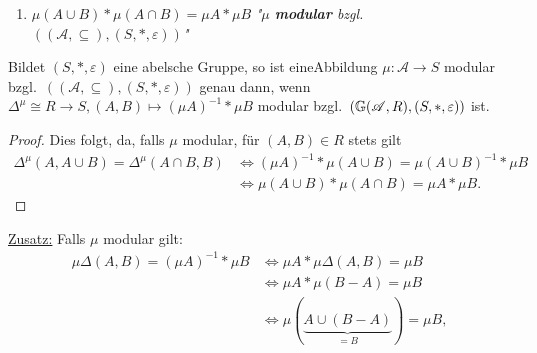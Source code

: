 \begin{beispiel}
\begin{enumerate}
        \item $\mu(A \cup B) \ast \mu(A \cap B) = \mu A \ast \mu B$ \textit{"$\mu$ \textbf{modular} bzgl. $((\mathscr{A},\subseteq),(S,\ast,\varepsilon))$"}
    \end{enumerate}
    \begin{proposition}
        \label{prop:FunktAbelschModular}
        Bildet $(S,\ast,\varepsilon)$ eine abelsche Gruppe, so ist eineAbbildung $\mu\colon\mathscr{A} \to S$ modular bzgl.~$((\mathscr{A},\subseteq),(S,\ast,\varepsilon))$ genau dann,
        wenn $\Delta^\mu\cong R \to S, (A,B) \mapsto (\mu A)^{-1}\ast \mu B$ modular bzgl.~$(\mathbb{G}(\mathscr{A},R),(S,\ast,\varepsilon))$ ist.
        \begin{proof}
            Dies folgt, da, falls $\mu$ modular, für $(A,B) \in R$ stets gilt
            \begin{align*}
                \Delta^\mu(A, A \cup B) = \Delta^\mu(A \cap B, B) & \iff (\mu A)^{-1} \ast \mu(A \cup B) = \mu(A \cup B)^{-1} \ast \mu B\\
                & \iff \mu(A \cup B) \ast \mu(A\cap B) = \mu A \ast \mu B.
            \end{align*}
        \end{proof}
    \end{proposition}
    \underline{Zusatz:} Falls $\mu$ modular gilt:
    \begin{align*}
        \mu\Delta(A,B) =(\mu A)^{-1}\ast \mu B &\iff \mu A \ast \mu\Delta(A,B) = \mu B\\
        & \iff \mu A \ast \mu (B-A) = \mu B\\
        & \iff \mu ( \underbrace{A \cup (B-A)}_{=B})= \mu B,
    \end{align*}
\end{beispiel}


